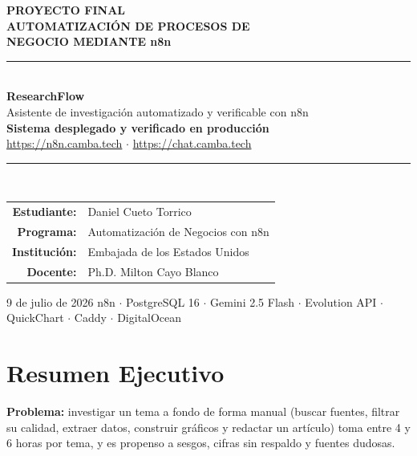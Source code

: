 \documentclass[11pt,a4paper]{article}
\begin{document}
\begin{titlepage}
\centering
\vspace*{1.2cm}
{\large\bfseries PROYECTO FINAL}\\[0.4cm]
{\LARGE\bfseries AUTOMATIZACIÓN DE PROCESOS DE\\ NEGOCIO MEDIANTE n8n}\\[1.6cm]

\rule{0.82\textwidth}{1pt}\\[0.5cm]
{\Huge\bfseries\color{azulref} ResearchFlow}\\[0.35cm]
{\large Asistente de investigación automatizado y verificable con n8n}\\[0.3cm]
{\normalsize\color{verdeok}\bfseries Sistema desplegado y verificado en producción}\\[0.15cm]
{\small\color{grismedio}\url{https://n8n.camba.tech} $\cdot$ \url{https://chat.camba.tech}}\\[0.5cm]
\rule{0.82\textwidth}{1pt}\\[2.2cm]

\begin{tabular}{rl}
\textbf{Estudiante:} & Daniel Cueto Torrico\\[0.25cm]
\textbf{Programa:} & Automatización de Negocios con n8n\\[0.25cm]
\textbf{Institución:} & Embajada de los Estados Unidos\\[0.25cm]
\textbf{Docente:} & Ph.D. Milton Cayo Blanco\\[0.25cm]
\end{tabular}

\vspace{2cm}
{\normalsize 9 de julio de 2026}
\vfill
{\small\color{grismedio} n8n $\cdot$ PostgreSQL 16 $\cdot$ Gemini 2.5 Flash $\cdot$ Evolution API $\cdot$ QuickChart $\cdot$ Caddy $\cdot$ DigitalOcean}
\end{titlepage}

\tableofcontents
\newpage

\section{Resumen Ejecutivo}
\textbf{Problema:} investigar un tema a fondo de forma manual (buscar fuentes, filtrar su calidad, extraer datos, construir gráficos y redactar un artículo) toma entre 4 y 6 horas por tema, y es propenso a sesgos, cifras sin respaldo y fuentes dudosas.
\end{document}
